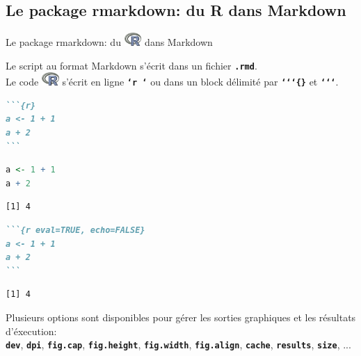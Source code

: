 \documentclass[10pt, xcolors={RGB}, hyperref={pdfpagelabels=false,
        colorlinks=true,
        linkcolor=black,
        urlcolor=black,
        citecolor=black,
        filecolor=black,
        menucolor=black,
        pdftex=true,
        bookmarks=true,
        bookmarksopen=true,
        hyperfootnotes=true}]{beamer}
\newcommand\cmdb[1]{\texttt{\color{dodgerblue}\textbf{#1}}}
\newcommand{\R}{\protect\includegraphics[height=0.5cm, keepaspectratio]{./Logos/logo_R2.png}}
\begin{document}
\subsection{Le package rmarkdown: du R dans Markdown}
\begin{frame}[containsverbatim]{Le package rmarkdown: du \R{} dans Markdown}
\par{Le script au format Markdown s'écrit dans un fichier \cmdb{.rmd}. \\Le code \R{} s'écrit en ligne \cmdb{`r `} ou dans un block délimité par \cmdb{`}\cmdb{`}\cmdb{`\{\}} et \cmdb{`}\cmdb{`}\cmdb{`}.}
\vspace{-3ex}
\begin{multicols}{2}
\begin{lstlisting}[language=md, xleftmargin=9mm, xrightmargin=2mm, lineskip=0ex, aboveskip=0ex]
```{r}
a <- 1 + 1
a + 2
```
\end{lstlisting}
\columnbreak
\begin{lstlisting}[language=R, xleftmargin=2mm, xrightmargin=9mm, lineskip=0ex]
a <- 1 + 1
a + 2
\end{lstlisting}
\vspace{-3ex}
\begin{lstlisting}[language=Rconsole, xleftmargin=2mm, xrightmargin=9mm, lineskip=0ex]
[1] 4
\end{lstlisting}
\end{multicols}
\vspace{-6ex}
\begin{multicols}{2}
\begin{lstlisting}[language=md, xleftmargin=9mm, xrightmargin=2mm, lineskip=0ex, aboveskip=0ex]
```{r eval=TRUE, echo=FALSE}
a <- 1 + 1
a + 2
```
\end{lstlisting}
\columnbreak
\begin{lstlisting}[language=Rconsole, xleftmargin=2mm, xrightmargin=9mm, lineskip=0ex]
[1] 4
\end{lstlisting}
\end{multicols}
\par{Plusieurs options sont disponibles pour gérer les sorties graphiques et les résultats d'éxecution:\\
\quad \cmdb{dev}, \cmdb{dpi}, \cmdb{fig.cap}, \cmdb{fig.height}, \cmdb{fig.width}, \cmdb{fig.align}, \cmdb{cache}, \cmdb{results}, \cmdb{size}, ...\\}
\end{frame}
\end{document}
